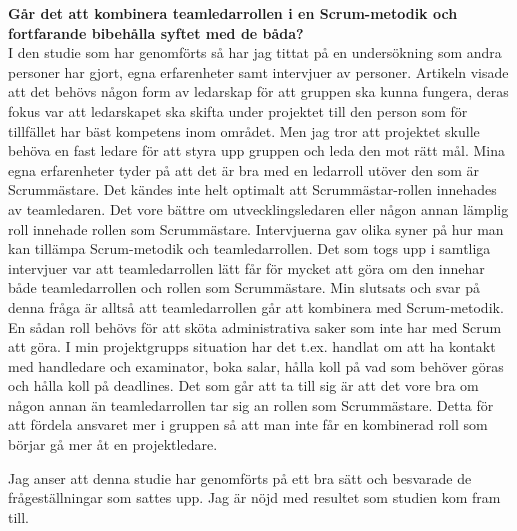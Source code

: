 \textbf{Går det att kombinera teamledarrollen i en Scrum-metodik och fortfarande bibehålla syftet med de båda?}\\
I den studie som har genomförts så har jag tittat på en undersökning som andra personer har gjort, egna erfarenheter samt intervjuer av personer. 
Artikeln visade att det behövs någon form av ledarskap för att gruppen ska kunna fungera, deras fokus var att ledarskapet ska skifta under projektet till den person som för tillfället har bäst kompetens inom området. Men jag tror att projektet skulle behöva en fast ledare för att styra upp gruppen och leda den mot rätt mål.
Mina egna erfarenheter tyder på att det är bra med en ledarroll utöver den som är Scrummästare. 
Det kändes inte helt optimalt att Scrummästar-rollen innehades av teamledaren. 
Det vore bättre om utvecklingsledaren eller någon annan lämplig roll innehade rollen som Scrummästare. 
Intervjuerna gav olika syner på hur man kan tillämpa Scrum-metodik och teamledarrollen. 
Det som togs upp i samtliga intervjuer var att teamledarrollen lätt får för mycket att göra om den innehar både teamledarrollen och rollen som Scrummästare.
Min slutsats och svar på denna fråga är alltså att teamledarrollen går att kombinera med Scrum-metodik. 
En sådan roll behövs för att sköta administrativa saker som inte har med Scrum att göra. 
I min projektgrupps situation har det t.ex. handlat om att ha kontakt med handledare och examinator, boka salar, hålla koll på vad som behöver göras och hålla koll på deadlines. 
Det som går att ta till sig är att det vore bra om någon annan än teamledarrollen tar sig an rollen som Scrummästare. 
Detta för att fördela ansvaret mer i gruppen så att man inte får en kombinerad roll som börjar gå mer åt en projektledare. 

Jag anser att denna studie har genomförts på ett bra sätt och besvarade de frågeställningar som sattes upp. Jag är nöjd med resultet som studien kom fram till.
